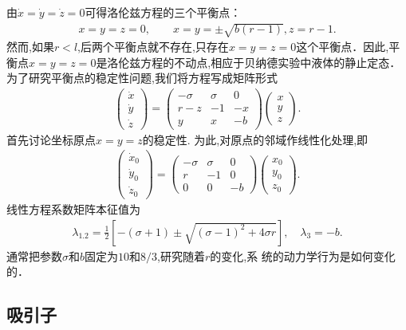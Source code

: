 由$\dot{x}=\dot{y}=\dot{z}=0$可得洛伦兹方程的三个平衡点：
\begin{align}
x=y=z=0,\qquad x=y=\pm\sqrt{b(r-1)}, z=r-1.
\end{align}
然而,如果$r<l$,后两个平衡点就不存在,只存在$x=y=z=0$这个平衡点．因此,平衡点$x=y=z=0$是洛伦兹方程的不动点,相应于贝纳德实验中液体的静止定态．为了研究平衡点的稳定性问题,我们将方程写成矩阵形式
\begin{align}
\left(\begin{array}{l}
\dot{x} \\
\dot{y} \\
\dot{z}
\end{array}\right)=\left(\begin{array}{ccc}
-\sigma & \sigma & 0 \\
r-z & -1 & -x \\
y & x & -b
\end{array}\right)\left(\begin{array}{l}
x \\
y \\
z
\end{array}\right) .
\end{align}
首先讨论坐标原点$x=y=z$的稳定性. 为此,对原点的邻域作线性化处理,即
\begin{align}
\left(\begin{array}{l}
\dot{x}_{0} \\
\dot{y}_{0} \\
\dot{z}_{0}
\end{array}\right)=\left(\begin{array}{ccc}
-\sigma & \sigma & 0 \\
r & -1 & 0 \\
0 & 0 & -b
\end{array}\right)\left(\begin{array}{l}
x_{0} \\
y_{0} \\
z_{0}
\end{array}\right).
\end{align}
线性方程系数矩阵本征值为
\begin{align}
\lambda_{1.2}=\frac{1}{2}\left[-(\sigma+1) \pm \sqrt{(\sigma-1)^{2}+4 \sigma r}\right], \quad \lambda_{3}=-b.
\end{align}
通常把参数$\sigma$和$b$固定为$10$和$8/3$,研究随着$r$的变化,系
统的动力学行为是如何变化的．

\subsection{吸引子}

